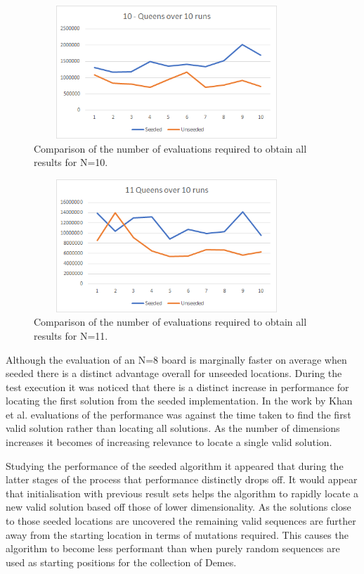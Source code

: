 \documentclass[conference]{IEEEtran}
\begin{document}
\begin{figure}[!htbp]
	\centering	
	\includegraphics[width=10cm, height=5cm]{10QueensAllValues}
		\caption{Comparison of the number of evaluations required to obtain all results for N=10.}
\end{figure}

\begin{figure}[!htbp]
	\centering	
	\includegraphics[width=10cm, height=5cm]{11QueensAllValues}
		\caption{Comparison of the number of evaluations required to obtain all results for N=11.}
\end{figure}

Although the evaluation of an N=8 board is marginally faster on average when seeded there is a distinct advantage overall for unseeded locations. During the test execution it was noticed that there is a distinct increase in performance for locating the first solution from the seeded implementation. In the work by Khan et al. \cite{ACO} evaluations of the performance was against the time taken to find the first valid solution rather than locating all solutions. As the number of dimensions increases it becomes of increasing relevance to locate a single valid solution.

Studying the performance of the seeded algorithm it appeared that during the latter stages of the process that performance distinctly drops off.  It would appear that initialisation with previous result sets helps the algorithm to rapidly locate a new valid solution based off those of lower dimensionality. As the solutions close to those seeded locations are uncovered the remaining valid sequences are further away from the starting location in terms of mutations required. This causes the algorithm to become less performant than when purely random sequences are used as starting positions for the collection of Demes.
\end{document}
